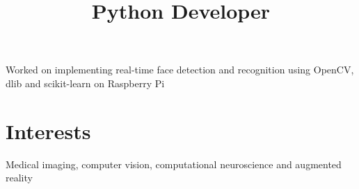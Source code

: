 \documentclass[margin]{res}
\begin{document}
\begin{resume}
      \title{\textbf{Python Developer}}
      \begin{position}
        Worked on implementing real-time face detection and recognition using OpenCV, dlib and scikit-learn on Raspberry Pi
      \end{position}


    \section{Interests}
      Medical imaging, computer vision, computational neuroscience and augmented reality

  \end{resume}
\end{document}
